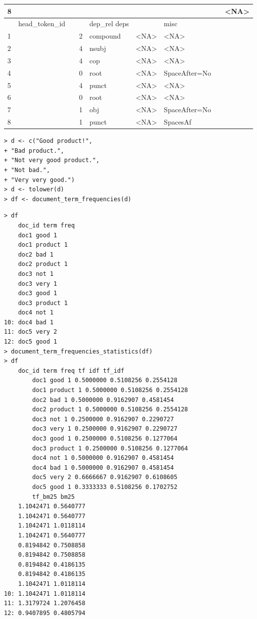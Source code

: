 \documentclass[10pt]{book}
\begin{document}
\begin{center}
\begin{tabular}{|l|l|l|l|l|l|l|l|l|}
\hline
8 &  &  &  &  &  &  &  & <NA> \\
\hline
 & head\_token\_id &  &  & dep\_rel deps &  & misc &  &  \\
\hline
1 &  &  & 2 & compound & <NA> & <NA> &  &  \\
\hline
2 &  &  & 4 & nsubj & <NA> & <NA> &  &  \\
\hline
3 &  &  & 4 & cop & <NA> & <NA> &  &  \\
\hline
4 &  &  & 0 & root & <NA> & SpaceAfter=No &  &  \\
\hline
5 &  &  & 4 & punct & <NA> & <NA> &  &  \\
\hline
6 &  &  & 0 & root & <NA> & <NA> &  &  \\
\hline
7 &  &  & 1 & obj & <NA> & SpaceAfter=No &  &  \\
\hline
8 &  &  & 1 & punct & <NA> & SpacesAf &  &  \\
\hline
\end{tabular}
\end{center}

\begin{verbatim}
> d <- c("Good product!",
+ "Bad product.",
+ "Not very good product.",
+ "Not bad.",
+ "Very very good.")
> d <- tolower(d)
> df <- document_term_frequencies(d)
\end{verbatim}

\begin{verbatim}
> df
    doc_id term freq
    doc1 good 1
    doc1 product 1
    doc2 bad 1
    doc2 product 1
    doc3 not 1
    doc3 very 1
    doc3 good 1
    doc3 product 1
    doc4 not 1
10: doc4 bad 1
11: doc5 very 2
12: doc5 good 1
> document_term_frequencies_statistics(df)
> df
    doc_id term freq tf idf tf_idf
        doc1 good 1 0.5000000 0.5108256 0.2554128
        doc1 product 1 0.5000000 0.5108256 0.2554128
        doc2 bad 1 0.5000000 0.9162907 0.4581454
        doc2 product 1 0.5000000 0.5108256 0.2554128
        doc3 not 1 0.2500000 0.9162907 0.2290727
        doc3 very 1 0.2500000 0.9162907 0.2290727
        doc3 good 1 0.2500000 0.5108256 0.1277064
        doc3 product 1 0.2500000 0.5108256 0.1277064
        doc4 not 1 0.5000000 0.9162907 0.4581454
        doc4 bad 1 0.5000000 0.9162907 0.4581454
        doc5 very 2 0.6666667 0.9162907 0.6108605
        doc5 good 1 0.3333333 0.5108256 0.1702752
        tf_bm25 bm25
    1.1042471 0.5640777
    1.1042471 0.5640777
    1.1042471 1.0118114
    1.1042471 0.5640777
    0.8194842 0.7508858
    0.8194842 0.7508858
    0.8194842 0.4186135
    0.8194842 0.4186135
    1.1042471 1.0118114
10: 1.1042471 1.0118114
11: 1.3179724 1.2076458
12: 0.9407895 0.4805794
\end{verbatim}
\end{document}
